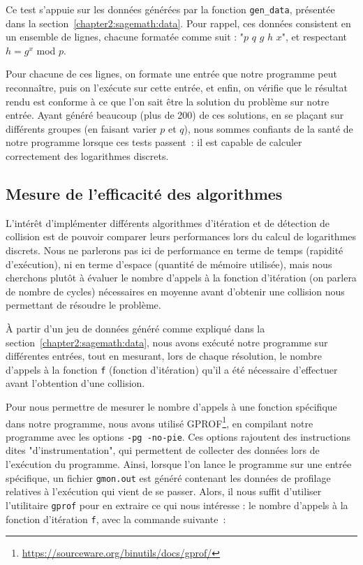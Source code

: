       Ce test s'appuie sur les données générées par la fonction \lstinline{gen_data}, présentée dans la section~\ref{chapter2:sagemath:data}. Pour rappel, ces données consistent en un ensemble de lignes, chacune formatée comme suit : "$p$ $q$ $g$ $h$ $x$", et respectant $h = g^x$ mod $p$.

      Pour chacune de ces lignes, on formate une entrée que notre programme peut reconnaître, puis on l'exécute sur cette entrée, et enfin, on vérifie que le résultat rendu est conforme à ce que l'on sait être la solution du problème sur notre entrée.
      Ayant généré beaucoup (plus de 200) de ces solutions, en se plaçant sur différents groupes (en faisant varier $p$ et $q$), nous sommes confiants de la santé de notre programme lorsque ces tests passent~: il est capable de calculer correctement des logarithmes discrets.


      \subsection{Mesure de l'efficacité des algorithmes}
      \label{chapter2:protocole_de_mesure}
      L'intérêt d'implémenter différents algorithmes d'itération et de détection de collision est de pouvoir comparer leurs performances lors du calcul de logarithmes discrets. Nous ne parlerons pas ici de performance en terme de temps (rapidité d'exécution), ni en terme d'espace (quantité de mémoire utilisée), mais nous cherchons plutôt à évaluer le nombre d'appels à la fonction d'itération (on parlera de nombre de cycles) nécessaires en moyenne avant d'obtenir une collision nous permettant de résoudre le problème.

      À partir d'un jeu de données généré comme expliqué dans la section~\ref{chapter2:sagemath:data}, nous avons exécuté notre programme sur différentes entrées, tout en mesurant, lors de chaque résolution, le nombre d'appels à la fonction \lstinline{f} (fonction d'itération) qu'il a été nécessaire d'effectuer avant l'obtention d'une collision.

      Pour nous permettre de mesurer le nombre d'appels à une fonction spécifique dans notre programme, nous avons utilisé GPROF\footnote{\url{https://sourceware.org/binutils/docs/gprof/}}, en compilant notre programme avec les options \lstinline{-pg -no-pie}. Ces options rajoutent des instructions dites "d'instrumentation", qui permettent de collecter des données lors de l'exécution du programme.
      Ainsi, lorsque l'on lance le programme sur une entrée spécifique, un fichier \lstinline{gmon.out} est généré contenant les données de profilage relatives à l'exécution qui vient de se passer. Alors, il nous suffit d'utiliser l'utilitaire \lstinline{gprof} pour en extraire ce qui nous intéresse : le nombre d'appels à la fonction d'itération \lstinline{f}, avec la commande suivante~:

